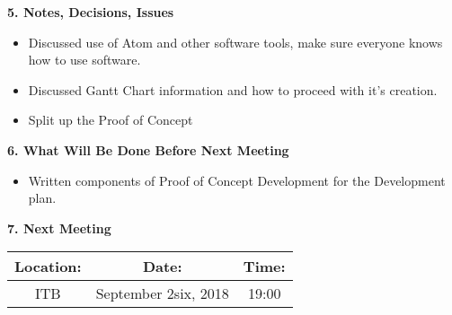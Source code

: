 \documentclass[12pt]{article}
\begin{document}
\begin{flushleft}
\textbf{5. Notes, Decisions, Issues}\\
\begin{itemize}
\item Discussed use of Atom and other software tools, make sure everyone knows how to use software.\\
\item Discussed Gantt Chart information and how to proceed with it's creation.\\
\item Split up the Proof of Concept\\
\end{itemize}
\textbf{6. What Will Be Done Before Next Meeting}\\
\begin{itemize}
\item Written components of Proof of Concept Development for the Development plan.

\end{itemize}

\textbf{7. Next Meeting}\\
\begin{center}
 \begin{tabular}{|c | c | c |} 
\hline
 Location: & Date: & Time: \\ 
 \hline
 ITB & September 2six, 2018 & 19:00\\
\hline
\end{tabular}
\end{center}

\end{flushleft}
\end{document}
